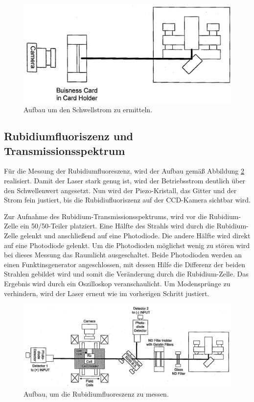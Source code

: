 \begin{figure}[H]
	\centering
	\includegraphics[width=\textwidth]{plots/setup_threshold.png}
	\caption{Aufbau um den Schwellstrom zu ermitteln. \cite{V60}}
	\label{fig:th}
\end{figure}

\subsection{Rubidiumfluoriszenz und Transmissionsspektrum}
\label{sec:Rubidium}

Für die Messung der Rubidiumfluoreszenz, wird der Aufbau gemäß Abbildung \ref{fig:sub} realisiert.
Damit der Laser stark genug ist, wird der Betriebsstrom deutlich über den Schwellenwert angesetzt.
Nun wird der Piezo-Kristall, das Gitter und der Strom fein justiert, bis die Rubidiufluoriszenz auf der CCD-Kamera sichtbar wird.

Zur Aufnahme des Rubidium-Transmissionsspektrums, wird vor die Rubidium-Zelle ein 50/50-Teiler platziert.
Eine Hälfte des Strahls wird durch die Rubidium-Zelle gelenkt und anschließend auf eine Photodiode.
Die andere Hälfte wird direkt auf eine Photodiode gelenkt.
Um die Photodioden möglichst wenig zu stören wird bei dieses Messung das Raumlicht ausgeschaltet.
Beide Photodioden werden an einen Funktinsgenerator angeschlossen, mit dessen Hilfe die Differenz der beiden Strahlen gebildet wird und somit die Veränderung durch die Rubidium-Zelle.
Das Ergebnis wird durch ein Oszilloskop veranschaulicht.
Um Modensprünge zu verhindern, wird der Laser erneut wie im vorherigen Schritt justiert.


\begin{figure}[H]
	\centering
	\includegraphics[width=\textwidth]{plots/setup_substraction.png}
	\caption{Aufbau, um die Rubidiumfluoreszenz zu messen. \cite{V60}}
	\label{fig:sub}
\end{figure}
